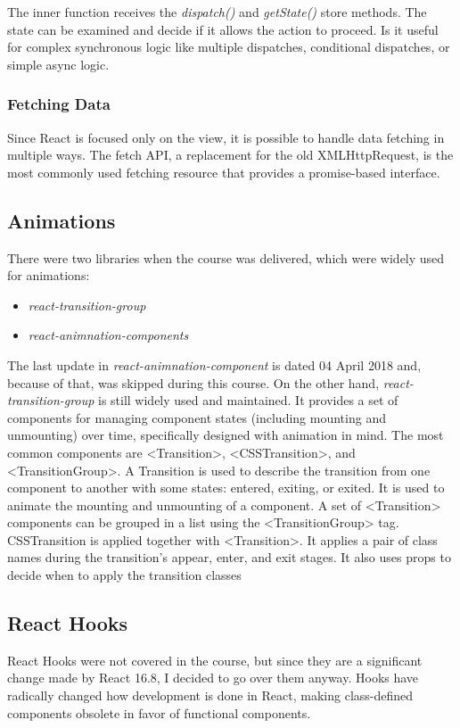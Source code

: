 The inner function receives the \textit{dispatch()} and \textit{getState()} store methods. The state can be examined and decide if it allows the action to proceed. Is it useful for complex synchronous logic like multiple dispatches, conditional dispatches, or simple async logic.

\subsubsection*{Fetching Data}
Since React is focused only on the view, it is possible to handle data fetching in multiple ways. The fetch API, a replacement for the old XMLHttpRequest, is the most commonly used fetching resource that provides a promise-based interface.

\subsection*{Animations}
There were two libraries when the course was delivered, which were widely used for animations:
\begin{itemize}
    \item \textit{react-transition-group}
    \item \textit{react-animnation-components}
\end{itemize} 
The last update in \textit{react-animnation-component} is dated 04 April 2018 and, because of that, was skipped during this course.
On the other hand, \textit{react-transition-group} is still widely used and maintained. It provides a set of components for managing component states (including mounting and unmounting) over time, specifically designed with animation in mind. The most common components are <Transition>, <CSSTransition>, and <TransitionGroup>.
A Transition is used to describe the transition from one component to another with some states: entered, exiting, or exited. It is used to animate the mounting and unmounting of a component. A set of <Transition> components can be grouped in a list using the <TransitionGroup> tag.
CSSTransition is applied together with <Transition>. It applies a pair of class names during the transition's appear, enter, and exit stages. It also uses props to decide when to apply the transition classes 


\subsection*{React Hooks}
React Hooks were not covered in the course, but since they are a significant change made by React 16.8, I decided to go over them anyway.
Hooks have radically changed how development is done in React, making class-defined components obsolete in favor of functional components.

